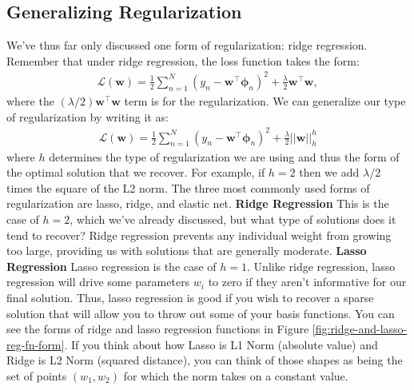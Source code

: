 \subsection{Generalizing Regularization}
We've thus far only discussed one form of regularization: ridge regression. Remember that under ridge regression, the loss function takes the form:
\begin{align*}
    \mathcal{L}(\mathbf{w}) = \frac{1}{2} \sum_{n=1}^{N} (y_n - \mathbf{w}^\top\boldsymbol{\phi}_n)^2 + \frac{\lambda}{2}\mathbf{w}^{\top}\mathbf{w},
\end{align*}
%
where the $(\lambda/2)\mathbf{w}^\top\mathbf{w}$ term is for the regularization. We can generalize our type of regularization by writing it as:
\begin{align*}
    \mathcal{L}(\mathbf{w}) = \frac{1}{2} \sum_{n=1}^{N} (y_n - \mathbf{w}^\top\boldsymbol{\phi}_n)^2 + \frac{\lambda}{2}\big|\big|\mathbf{w}\big|\big|_h^{h}
\end{align*}
where $h$ determines the type of regularization we are using and thus the form of the optimal solution that we recover. For example, if $h=2$ then we add $\lambda/2$ times the square of the L2 norm.
The three most commonly used forms of regularization are lasso, ridge, and elastic net. \newline \newline
\textbf{Ridge Regression} \newline
This is the case of $h = 2$, which we've already discussed, but what type of solutions does it tend to recover? Ridge regression prevents any individual weight from growing too large, providing us with solutions that are generally moderate. \newline \newline
\textbf{Lasso Regression} \newline
Lasso regression is the case of $h = 1$. Unlike ridge regression, lasso regression will drive some parameters $w_i$ to zero if they aren't informative for our final solution. Thus, lasso regression is good if you wish to recover a sparse solution that will allow you to throw out some of your basis functions. You can see the forms of ridge and lasso regression functions in Figure \ref{fig:ridge-and-lasso-reg-fn-form}.
If you think about how Lasso is L1 Norm (absolute value) and Ridge is L2 Norm (squared distance), you can think of those shapes as being the set of points $(w_1,w_2)$ for which the norm takes on a constant value.
%
\newline
\newline

